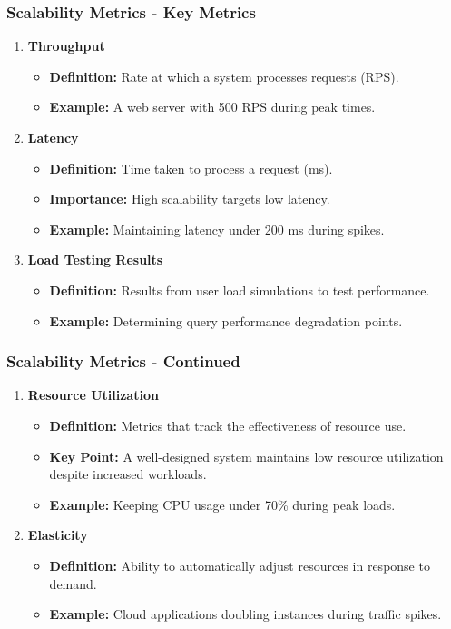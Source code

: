 \documentclass[aspectratio=169]{beamer}
\begin{document}
\begin{frame}[fragile]
    \frametitle{Scalability Metrics - Key Metrics}
    \begin{enumerate}
        \item \textbf{Throughput}
        \begin{itemize}
            \item \textbf{Definition:} Rate at which a system processes requests (RPS).
            \item \textbf{Example:} A web server with 500 RPS during peak times.
        \end{itemize}
        
        \item \textbf{Latency}
        \begin{itemize}
            \item \textbf{Definition:} Time taken to process a request (ms).
            \item \textbf{Importance:} High scalability targets low latency.
            \item \textbf{Example:} Maintaining latency under 200 ms during spikes.
        \end{itemize}
        
        \item \textbf{Load Testing Results}
        \begin{itemize}
            \item \textbf{Definition:} Results from user load simulations to test performance.
            \item \textbf{Example:} Determining query performance degradation points.
        \end{itemize}
    \end{enumerate}
\end{frame}

\begin{frame}[fragile]
    \frametitle{Scalability Metrics - Continued}
    \begin{enumerate}[resume]
        \item \textbf{Resource Utilization}
        \begin{itemize}
            \item \textbf{Definition:} Metrics that track the effectiveness of resource use.
            \item \textbf{Key Point:} A well-designed system maintains low resource utilization despite increased workloads. 
            \item \textbf{Example:} Keeping CPU usage under 70\% during peak loads.
        \end{itemize}
        
        \item \textbf{Elasticity}
        \begin{itemize}
            \item \textbf{Definition:} Ability to automatically adjust resources in response to demand.
            \item \textbf{Example:} Cloud applications doubling instances during traffic spikes.
        \end{itemize}
    \end{enumerate}
\end{frame}
\end{document}
